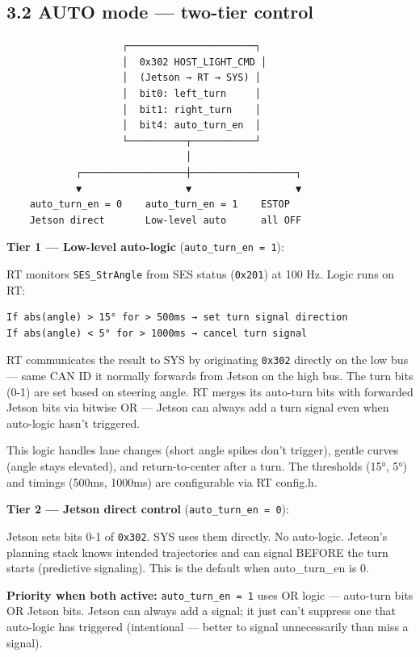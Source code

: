 \documentclass[12pt,a4paper,oneside]{report}
\begin{document}
\subsection{3.2 AUTO mode --- two-tier
control}\label{auto-mode-two-tier-control}

\begin{verbatim}
                    ┌──────────────────────┐
                    │  0x302 HOST_LIGHT_CMD │
                    │  (Jetson → RT → SYS) │
                    │  bit0: left_turn     │
                    │  bit1: right_turn    │
                    │  bit4: auto_turn_en  │
                    └──────────┬───────────┘
                               │
            ┌──────────────────┼──────────────────┐
            ▼                  ▼                  ▼
    auto_turn_en = 0    auto_turn_en = 1    ESTOP
    Jetson direct       Low-level auto      all OFF
\end{verbatim}

\textbf{Tier 1 --- Low-level auto-logic} (\texttt{auto\_turn\_en\ =\ 1}):

RT monitors \texttt{SES\_StrAngle} from SES status (\texttt{0x201}) at 100 Hz.
Logic runs on RT:

\begin{verbatim}
If abs(angle) > 15° for > 500ms → set turn signal direction
If abs(angle) < 5° for > 1000ms → cancel turn signal
\end{verbatim}

RT communicates the result to SYS by originating \texttt{0x302} directly on the
low bus --- same CAN ID it normally forwards from Jetson on the high bus. The
turn bits (0-1) are set based on steering angle. RT merges its auto-turn bits
with forwarded Jetson bits via bitwise OR --- Jetson can always add a turn
signal even when auto-logic hasn't triggered.

This logic handles lane changes (short angle spikes don't trigger), gentle
curves (angle stays elevated), and return-to-center after a turn. The thresholds
(15°, 5°) and timings (500ms, 1000ms) are configurable via RT config.h.

\textbf{Tier 2 --- Jetson direct control} (\texttt{auto\_turn\_en\ =\ 0}):

Jetson sets bits 0-1 of \texttt{0x302}. SYS uses them directly. No auto-logic.
Jetson's planning stack knows intended trajectories and can signal BEFORE the
turn starts (predictive signaling). This is the default when auto\_turn\_en is
0.

\textbf{Priority when both active:} \texttt{auto\_turn\_en\ =\ 1} uses OR logic
--- auto-turn bits OR Jetson bits. Jetson can always add a signal; it just can't
suppress one that auto-logic has triggered (intentional --- better to signal
unnecessarily than miss a signal).
\end{document}
